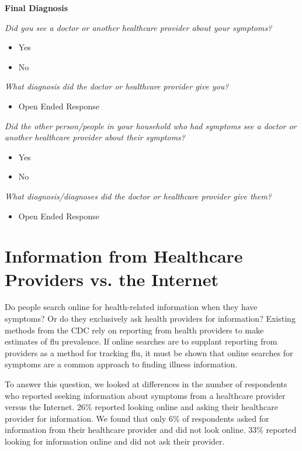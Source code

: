 \documentclass[12pt]{article}
\begin{document}
\textbf{Final Diagnosis}

\emph{Did you see a doctor or another healthcare provider about your symptoms?}
\begin{itemize}
\item Yes
\item No
\end{itemize}

\emph{What diagnosis did the doctor or healthcare provider give you?}
\begin{itemize}
\item Open Ended Response
\end{itemize}
 
\emph{Did the other person/people in your household who had symptoms see a doctor or another healthcare provider about their symptoms?}
\begin{itemize}
\item Yes
\item No
\end{itemize}

\emph{What diagnosis/diagnoses did the doctor or healthcare provider give them?}
\begin{itemize}
\item Open Ended Response
\end{itemize}




\section{Information from Healthcare Providers vs. the Internet}

Do people search online for health-related information when they have symptoms? Or do they exclusively ask health providers for information? Existing methods from the CDC rely on reporting from health providers to make estimates of flu prevalence. If online searches are to supplant reporting from providers as a method for tracking flu, it must be shown that online searches for symptoms are a common approach to finding illness information. 

To answer this question, we looked at differences in the number of respondents who reported seeking information about symptoms from a healthcare provider versus the Internet. 26\% reported looking online and asking their healthcare provider for information. We found that only 6\% of respondents asked for information from their healthcare provider and did not look online. 33\% reported looking for information online and did not ask their provider. 
\end{document}
